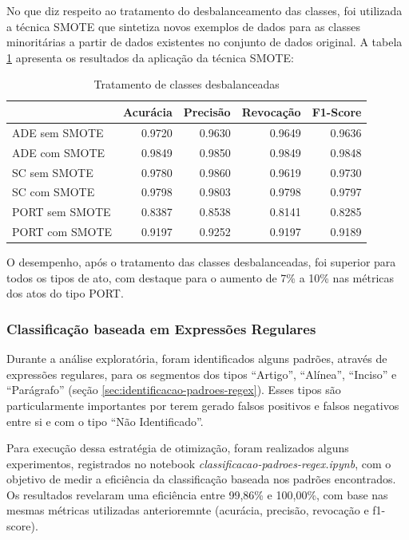 No que diz respeito ao tratamento do desbalanceamento das classes, foi utilizada a técnica SMOTE\cite{Smote2002} que sintetiza novos exemplos de dados para as classes minoritárias a partir de dados existentes no conjunto de dados original. A tabela \ref{tab:resultados-oversampling} apresenta os resultados da aplicação da técnica SMOTE:

\begin{table}[h]
\caption{Tratamento de classes desbalanceadas}
\label{tab:resultados-oversampling}
	\begin{center}
	\begin{tabular}{lrrrr}
		\toprule
		{} &  Acurácia &  Precisão &  Revocação &      F1-Score \\
		\midrule
		ADE sem SMOTE        &    0.9720 &    0.9630 &     0.9649 &  0.9636 \\
		ADE com SMOTE    &    0.9849 &    0.9850 &     0.9849 &  0.9848 \\
		SC sem SMOTE     &    0.9780 &    0.9860 &     0.9619 &  0.9730 \\
		SC com SMOTE &    0.9798 &    0.9803 &     0.9798 &  0.9797 \\
		PORT sem SMOTE     &    0.8387 &    0.8538 &     0.8141 &  0.8285 \\
		PORT com SMOTE &    0.9197 &    0.9252 &     0.9197 &  0.9189 \\
		\bottomrule
	\end{tabular}
	\end{center}		
\end{table}

O desempenho, após o tratamento das classes desbalanceadas, foi superior para todos os tipos de ato, com destaque para o aumento de 7\% a 10\% nas métricas dos atos do tipo PORT.

\subsubsection{Classificação baseada em Expressões Regulares}

Durante a análise exploratória, foram identificados alguns padrões, através de expressões regulares, para os segmentos dos tipos ``Artigo'', ``Alínea'', ``Inciso'' e ``Parágrafo'' (seção \ref{sec:identificacao-padroes-regex}). Esses tipos são particularmente importantes por terem gerado falsos positivos e falsos negativos entre si e com o tipo ``Não Identificado''.

Para execução dessa estratégia de otimização, foram realizados alguns experimentos, registrados no notebook \textit{classificacao-padroes-regex.ipynb}, com o objetivo de medir a eficiência da classificação baseada nos padrões encontrados. Os resultados revelaram uma eficiência entre 99,86\% e 100,00\%, com base nas mesmas métricas utilizadas anterioremnte (acurácia,  precisão, revocação e f1-score).

